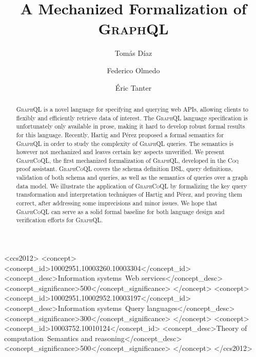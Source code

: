 \documentclass[sigplan,screen]{acmart}
\newcommand{\plstyle}[1]{\mbox{\textsc{#1}}\xspace}
\newcommand{\gql}{\plstyle{GraphQL}}
\newcommand{\gcoql}{\plstyle{GraphCoQL}}
\newcommand{\coq}{\plstyle{Coq}}
\begin{document}
\title{A Mechanized Formalization of \gql}
\author{Tomás Díaz}

\author{Federico Olmedo}

\author{Éric Tanter}

\begin{abstract}
\gql is a novel language for specifying and querying web APIs,
allowing clients to flexibly and efficiently retrieve data of
interest. The \gql language specification is unfortunately only
available in prose, making it hard to develop robust formal results
for this language. Recently, Hartig and Pérez proposed a formal
semantics for \gql in order to study the complexity of \gql
queries. The semantics is however not mechanized and leaves certain key aspects unverified. We present \gcoql, the first mechanized formalization of \gql, developed in the \coq proof assistant.  \gcoql covers the schema definition DSL, query definitions, validation of both schema and queries, as well as the semantics of queries over a graph data model.
We illustrate the application of \gcoql by formalizing the key query transformation and interpretation techniques of Hartig and Pérez, and proving them correct, after addressing some imprecisions and minor issues. 
We hope that \gcoql can serve as a solid formal baseline for both language design and verification efforts for \gql.
\end{abstract}

\begin{CCSXML}
<ccs2012>
<concept>
<concept_id>10002951.10003260.10003304</concept_id>
<concept_desc>Information systems~Web services</concept_desc>
<concept_significance>500</concept_significance>
</concept>
<concept>
<concept_id>10002951.10002952.10003197</concept_id>
<concept_desc>Information systems~Query languages</concept_desc>
<concept_significance>300</concept_significance>
</concept>
<concept>
<concept_id>10003752.10010124</concept_id>
<concept_desc>Theory of computation~Semantics and reasoning</concept_desc>
<concept_significance>500</concept_significance>
</concept>
</ccs2012>
\end{CCSXML}
\end{document}
